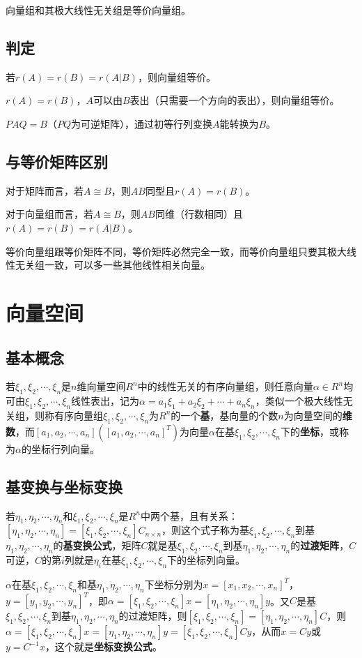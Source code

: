 向量组和其极大线性无关组是等价向量组。

\subsection{判定}

若$r(A)=r(B)=r(A|B)$，则向量组等价。

$r(A)=r(B)$，$A$可以由$B$表出（只需要一个方向的表出），则向量组等价。

$PAQ=B$（$PQ$为可逆矩阵），通过初等行列变换$A$能转换为$B$。

\subsection{与等价矩阵区别}

对于矩阵而言，若$A\cong B$，则$AB$同型且$r(A)=r(B)$。

对于向量组而言，若$A\cong B$，则$AB$同维（行数相同）且$r(A)=r(B)=r(A|B)$。

等价向量组跟等价矩阵不同，等价矩阵必然完全一致，而等价向量组只要其极大线性无关组一致，可以多一些其他线性相关向量。

\section{向量空间}

\subsection{基本概念}

若$\xi_1,\xi_2,\cdots,\xi_n$是$n$维向量空间$R^n$中的线性无关的有序向量组，则任意向量$\alpha\in R^n$均可由$\xi_1,\xi_2,\cdots,\xi_n$线性表出，记为$\alpha=a_1\xi_1+a_2\xi_2+\cdots+a_n\xi_n$，类似一个极大线性无关组，则称有序向量组$\xi_1,\xi_2,\cdots,\xi_n$为$R^n$的一个\textbf{基}，基向量的个数$n$为向量空间的\textbf{维数}，而$[a_1,a_2,\cdots,a_n]([a_1,a_2,\cdots,a_n]^T)$为向量$\alpha$在基$\xi_1,\xi_2,\cdots,\xi_n$下的\textbf{坐标}，或称为$\alpha$的坐标行列向量。

\subsection{基变换与坐标变换}

若$\eta_1,\eta_2,\cdots,\eta_n$和$\xi_1,\xi_2,\cdots,\xi_n$是$R^n$中两个基，且有关系：$[\eta_1,\eta_2,\cdots,\eta_n]=[\xi_1,\xi_2,\cdots,\xi_n]C_{n\times n}$，则这个式子称为基$\xi_1,\xi_2,\cdots,\xi_n$到基$\eta_1,\eta_2,\cdots,\eta_n$的\textbf{基变换公式}，矩阵$C$就是基$\xi_1,\xi_2,\cdots,\xi_n$到基$\eta_1,\eta_2,\cdots,\eta_n$的\textbf{过渡矩阵}，$C$可逆，$C$的第$i$列就是$\eta_i$在基$\xi_1,\xi_2,\cdots,\xi_n$下的坐标列向量。

$\alpha$在基$\xi_1,\xi_2,\cdots,\xi_n$和基$\eta_1,\eta_2,\cdots,\eta_n$下坐标分别为$x=[x_1,x_2,\cdots,x_n]^T$，$y=[y_1,y_2,\cdots,y_n]^T$，即$\alpha=[\xi_1,\xi_2,\cdots,\xi_n]x=[\eta_1,\eta_2,\cdots,\eta_n]y$。又$C$是基$\xi_1,\xi_2,\cdots,\xi_n$到基$\eta_1,\eta_2,\cdots,\eta_n$的过渡矩阵，则$[\xi_1,\xi_2,\cdots,\xi_n]=[\eta_1,\eta_2,\cdots,\eta_n]C$，则$\alpha=[\xi_1,\xi_2,\cdots,\xi_n]x=[\eta_1,\eta_2,\cdots,\eta_n]y=[\xi_1,\xi_2,\cdots,\xi_n]Cy$，从而$x=Cy$或$y=C^{-1}x$，这个就是\textbf{坐标变换公式}。

%
